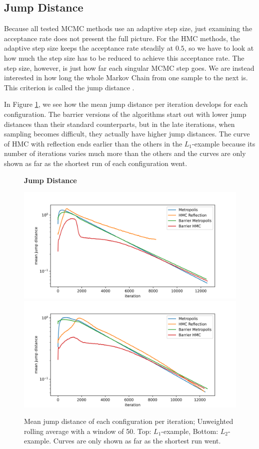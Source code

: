 \documentclass[12pt, a4paper]{report}
\begin{document}
\subsection{Jump Distance}
Because all tested MCMC methods use an adaptive step size, just examining the acceptance rate does not present the full picture.
For the HMC methods, the adaptive step size keeps the acceptance rate steadily at $0.5$, so we have to look at how much the step size has to be reduced to achieve this acceptance rate.
The step size, however, is just how far each singular MCMC step goes.
We are instead interested in how long the whole Markov Chain from one sample to the next is.
This criterion is called the jump distance \cite{rjd}.

In Figure \ref{figs:results_jump_distances}, we see how the mean jump distance per iteration develops for each configuration.
The barrier versions of the algorithms start out with lower jump distances than their standard counterparts, but in the late iterations, when sampling becomes difficult, they actually have higher jump distances.
The curve of HMC with reflection ends earlier than the others in the $L_1$-example because its number of iterations varies much more than the others and the curves are only shown as far as the shortest run of each configuration went.
\begin{figure}
    \centering
    {\small \textbf{Jump Distance} \par}
    \includegraphics[scale=0.7]{figs/results/mean_jump_distances_spike_20d.png}
    \includegraphics[scale=0.7]{figs/results/mean_jump_distances_spike_offcenter_20d.png}
    \caption{Mean jump distance of each configuration per iteration; Unweighted rolling average with a window of 50. Top: $L_1$-example, Bottom: $L_2$-example. Curves are only shown as far as the shortest run went.}
    \label{figs:results_jump_distances}
\end{figure}
\end{document}
